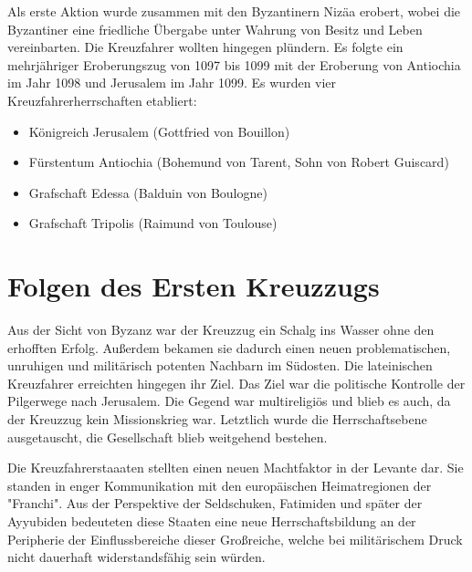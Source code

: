 \documentclass[10pt,a4paper,oneside,ngerman,numbers=noenddot]{scrartcl}
\begin{document}
Als erste Aktion wurde zusammen mit den Byzantinern Nizäa erobert, wobei die
Byzantiner eine friedliche Übergabe unter Wahrung von Besitz und Leben vereinbarten.
Die Kreuzfahrer wollten hingegen plündern. Es folgte ein mehrjähriger
Eroberungszug von 1097 bis 1099 mit der Eroberung von Antiochia im Jahr 1098
und Jerusalem im Jahr 1099. Es wurden vier Kreuzfahrerherrschaften etabliert:

\begin{itemize}
    \item Königreich Jerusalem (Gottfried von Bouillon)
    \item Fürstentum Antiochia (Bohemund von Tarent, Sohn von Robert Guiscard)
    \item Grafschaft Edessa (Balduin von Boulogne)
    \item Grafschaft Tripolis (Raimund von Toulouse)
\end{itemize}

\section{Folgen des Ersten Kreuzzugs}

Aus der Sicht von Byzanz war der Kreuzzug ein Schalg ins Wasser ohne den
erhofften Erfolg. Außerdem bekamen sie dadurch einen neuen problematischen, unruhigen
und militärisch potenten Nachbarn im Südosten. Die lateinischen Kreuzfahrer
erreichten hingegen ihr Ziel. Das Ziel war die politische Kontrolle der Pilgerwege
nach Jerusalem. Die Gegend war multireligiös und blieb es auch, da der Kreuzzug
kein Missionskrieg war. Letztlich wurde die Herrschaftsebene ausgetauscht, die
Gesellschaft blieb weitgehend bestehen.

Die Kreuzfahrerstaaaten stellten einen neuen Machtfaktor in der Levante dar.
Sie standen in enger Kommunikation mit den europäischen Heimatregionen der
"Franchi". Aus der Perspektive der Seldschuken, Fatimiden und später der
Ayyubiden bedeuteten diese Staaten eine neue Herrschaftsbildung an der Peripherie
der Einflussbereiche dieser Großreiche, welche bei militärischem Druck nicht
dauerhaft widerstandsfähig sein würden.
\end{document}
